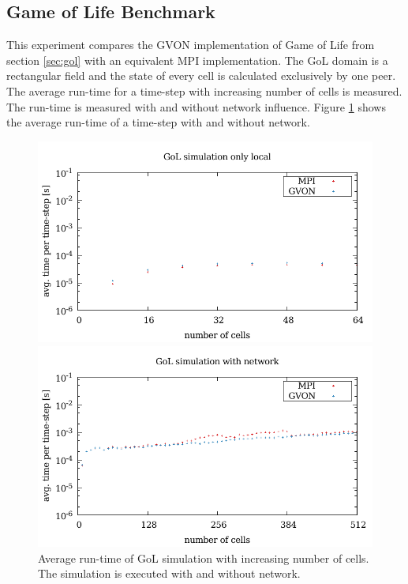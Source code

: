 \subsection{Game of Life Benchmark}
This experiment compares the GVON implementation of Game of Life from
section \ref{sec:gol} with an equivalent MPI implementation. The GoL
domain is a rectangular field and the state of every cell is
calculated exclusively by one peer. The average run-time for a
time-step with increasing number of cells is measured. The run-time is
measured with and without network influence.  Figure
\ref{fig:gol_laser} shows the average run-time of a time-step with and
without network.

\begin{figure}[H]
  \begin{minipage}[t]{0.5\textwidth}
    \includegraphics[width=\textwidth]{plots/50_gol_ncells_laser}
  \end{minipage}%
  \begin{minipage}[t]{0.5\textwidth}
    \includegraphics[width=\textwidth]{plots/50_gol_network_laser}
  \end{minipage}%
  \label{fig:gol_laser}
  \caption{Average run-time of GoL simulation with increasing number
    of cells. The simulation is executed with and without network.}
\end{figure}

